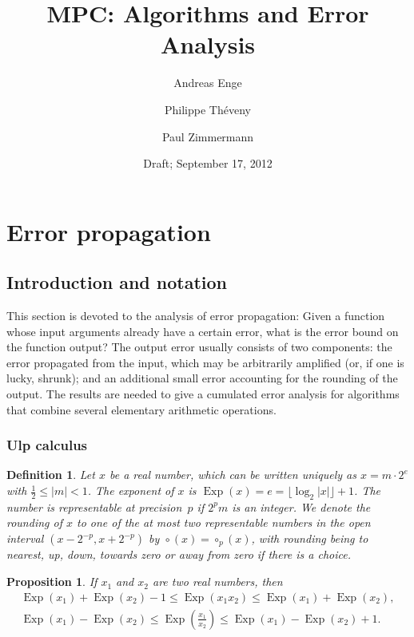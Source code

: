 \documentclass [12pt]{article}
\title {MPC: Algorithms and Error Analysis}
\author {Andreas Enge \and Philippe Th\'eveny \and Paul Zimmermann}
\date {Draft; September 17, 2012}
\DeclareMathOperator{\Exp}{\operatorname {Exp}}
\newcommand {\round}{\operatorname {\circ}}
\renewcommand {\leq}{\leqslant}
\newtheorem{definition}[theorem]{Definition}
\newtheorem{prop}[theorem]{Proposition}
\begin{document}
\maketitle
\tableofcontents


\section {Error propagation}

\subsection {Introduction and notation}

This section is devoted to the analysis of error propagation: Given a function
whose input arguments already have a certain error, what is the error bound on
the function output? The output error usually consists of two components: the
error propagated from the input, which may be arbitrarily amplified (or, if
one is lucky, shrunk); and an
additional small error accounting for the rounding of the output. The results
are needed to give a cumulated error analysis for algorithms that combine
several elementary arithmetic operations.


\subsubsection {Ulp calculus}

\begin {definition}
\label {def:exp}
Let $x$ be a real number, which can be written uniquely as
$x = m \cdot 2^e$ with $\frac{1}{2} \le |m| < 1$.
The {\em exponent} of $x$ is
$\Exp(x) = e = \lfloor \log_2 |x| \rfloor + 1$.
The number is {\em representable at precision~$p$} if
$2^p m$ is an integer.
We denote the rounding of $x$ to one of the at most two representable
numbers in the open interval $(x - 2^{-p}, x + 2^{-p})$ by
$\round (x) = \round_p (x)$, with rounding being to nearest, up, down,
towards zero or away from zero if there is a choice.
\end {definition}

\begin {prop}
\label {prop:expmuldiv}
If $x_1$ and $x_2$ are two real numbers, then
\begin {gather*}
\Exp (x_1) + \Exp (x_2) - 1 \leq \Exp (x_1 x_2) \leq \Exp (x_1) + \Exp (x_2),
\\
\Exp (x_1) - \Exp (x_2) \leq \Exp \left( \frac {x_1}{x_2} \right)
\leq \Exp (x_1) - \Exp (x_2) + 1.
\end {gather*}
\end {prop}
\end{document}
